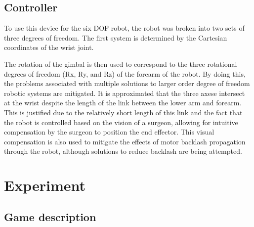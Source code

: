 \documentclass[journal,twoside]{JoPhA}
\begin{document}
% 
%
%
%





\subsection{Controller}
{\color{red}{Hay que adaptar a nuestro sistema}}

To use this device for the six DOF robot, the robot was broken into two 
sets of three degrees of freedom.  The first system is determined by 
the Cartesian coordinates of the wrist joint.  

The  rotation  of  the  gimbal  is  then  used  to  correspond  to  the  three rotational  degrees  of  freedom  (Rx,  Ry,  and  Rz)  of  the  forearm  of  the  robot.    
By  doing  this,  the  problems  associated  with  multiple  solutions  to  larger  order  degree  of  freedom  robotic  systems  are  mitigated.    
It  is  approximated  that  the  three  axese intersect  at  the  wrist despite the length of the link between the lower arm and forearm.  
This is justified due to the relatively short length of this link and the fact that the robot is controlled based on the vision of a surgeon, allowing for intuitive compensation by the surgeon to position the  end  effector.
This  visual  compensation  is  also  used  to  mitigate  the  effects  of  motor backlash propagation through the robot, although solutions to reduce backlash are being attempted.

\section{Experiment}
\label{sec:experiment}

\subsection{Game description}
\end{document}
